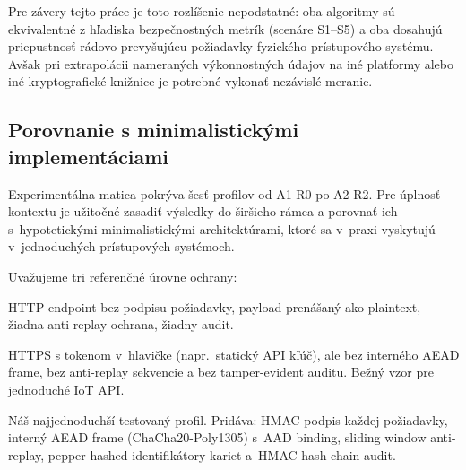 \noindent Pre závery tejto práce je toto rozlíšenie nepodstatné: oba algoritmy sú ekvivalentné z hľadiska bezpečnostných metrík (scenáre S1--S5) a oba dosahujú priepustnosť rádovo prevyšujúcu požiadavky fyzického prístupového systému. Avšak pri extrapolácii nameraných výkonnostných údajov na iné platformy alebo iné kryptografické knižnice\cite{OpenSSL,BoringSSL} je potrebné vykonať nezávislé meranie.

\subsection{Porovnanie s minimalistickými implementáciami}
\label{sec:baseline_comparison}

Experimentálna matica pokrýva šesť profilov od A1-R0 po A2-R2. Pre úplnosť kontextu je užitočné zasadiť výsledky do širšieho rámca a porovnať ich s~hypotetickými minimalistickými architektúrami, ktoré sa v~praxi vyskytujú v~jednoduchých prístupových systémoch.

Uvažujeme tri referenčné úrovne ochrany:
\begin{description}[leftmargin=*,itemsep=3pt]
  \item[B0 --- bez kryptografickej ochrany:] HTTP endpoint bez podpisu požiadavky, payload prenášaný ako plaintext, žiadna anti-replay ochrana, žiadny audit.
  \item[B1 --- základný HTTPS:] HTTPS s tokenom v~hlavičke (napr.\ statický API kľúč), ale bez interného AEAD frame, bez anti-replay sekvencie a bez tamper-evident auditu. Bežný vzor pre jednoduché IoT API.
  \item[A1-R0 --- základný profil tejto práce:] Náš najjednoduchší testovaný profil. Pridáva: HMAC podpis každej požiadavky, interný AEAD frame (ChaCha20-Poly1305) s~AAD binding, sliding window anti-replay, pepper-hashed identifikátory kariet a~HMAC hash chain audit.
\end{description}

